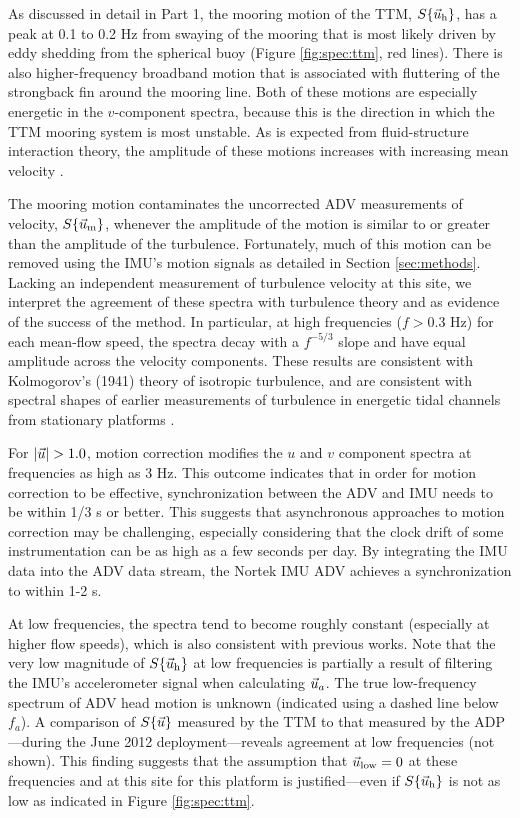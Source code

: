 As discussed in detail in Part 1, the mooring motion of the TTM, $S\{\vec{u}_\mathrm{h}\}$, has a peak at 0.1 to 0.2 Hz from swaying of the mooring that is most likely driven by eddy shedding from the spherical buoy (Figure \ref{fig:spec:ttm}, red lines). There is also higher-frequency broadband motion that is associated with fluttering of the strongback fin around the mooring line. Both of these motions are especially energetic in the $v$-component spectra, because this is the direction in which the TTM mooring system is most unstable. As is expected from fluid-structure interaction theory, the amplitude of these motions increases with increasing mean velocity \cite[]{Morison++1950}.

The mooring motion contaminates the uncorrected ADV measurements of velocity, $S\{\vec{u}_\mathrm{m}\}$, whenever the amplitude of the motion is similar to or greater than the amplitude of the turbulence. Fortunately, much of this motion can be removed using the IMU's motion signals as detailed in Section \ref{sec:methods}. Lacking an independent measurement of turbulence velocity at this site, we interpret the agreement of these spectra with turbulence theory and as evidence of the success of the method. In particular, at high frequencies ($f>0.3$ Hz) for each mean-flow speed, the spectra decay with a $f^{-5/3}$ slope and have equal amplitude across the velocity components. These results are consistent with Kolmogorov's (1941) theory of isotropic turbulence, and are consistent with spectral shapes of earlier measurements of turbulence in energetic tidal channels from stationary platforms \cite[]{Kolmogorov1941c,Walter++2011,Thomson++2012,McMillan++2016}.

For $|\ue|>1.0$, motion correction modifies the $u$ and $v$ component spectra at frequencies as high as 3 Hz. This outcome indicates that in order for motion correction to be effective, synchronization between the ADV and IMU needs to be within 1/3 s or better. This suggests that asynchronous approaches to motion correction may be challenging, especially considering that the clock drift of some instrumentation can be as high as a few seconds per day. By integrating the IMU data into the ADV data stream, the Nortek IMU ADV achieves a synchronization to within 1-2 s. 

At low frequencies, the spectra tend to become roughly constant (especially at higher flow speeds), which is also consistent with previous works. Note that the very low magnitude of $S\{\vec{u}_\mathrm{h}\}$ at low frequencies is partially a result of filtering the IMU's accelerometer signal when calculating $\vec{u}_a$. The true low-frequency spectrum of ADV head motion is unknown (indicated using a dashed line below $f_a$). A comparison of $S\{\vec{u}\}$ measured by the TTM to that measured by the ADP---during the June 2012 deployment---reveals agreement at low frequencies (not shown). This finding suggests that the assumption that $\vec{u}_\mathrm{low}=0$ at these frequencies and at this site for this platform is justified---even if $S\{\vec{u}_\mathrm{h}\}$ is not as low as indicated in Figure \ref{fig:spec:ttm}.

